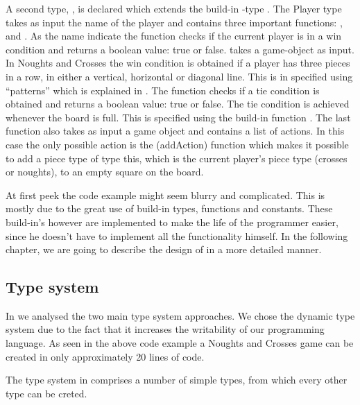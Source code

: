A second type, , is declared which extends the build-in \productname{}-type . The Player type
takes as input the name of the player and contains three important functions: ,  and 
. As the name indicate the  function checks if the current player is in a win condition and returns
a boolean value: true or false.  takes a game-object as input. In Noughts and Crosses the win condition is obtained if a player has three pieces in a row, in either a vertical, horizontal or diagonal line. This is in \productname{} specified using ``patterns'' which is explained in . The  function checks if a tie condition is obtained and returns a boolean value: true or false. The tie condition is achieved whenever the board is full. This is specified using the build-in function . The last function  also takes as input a game object and contains a list of actions. In this case the only possible action is the \function(addAction) function which makes it possible to add a piece type of type this, which is the current player's piece type (crosses or noughts), to an empty square on the board.

At first peek the code example might seem blurry and complicated. This is mostly due to the great use of build-in
types, functions and constants. These build-in's however are implemented to make the life of the programmer easier, since 
he doesn't have to implement all the functionality himself. In the following chapter, we are going to describe the design of \productname{} in a
more detailed manner.  


\subsection*{Type system}

In  we analysed the two main type system approaches. 
We chose the dynamic type system due to the fact that it increases the writability of our programming language. As seen in the
above code example  a Noughts and Crosses game can be created in only approximately 20 lines
of code.

The type system in \productname{} comprises a number of simple types, from which every other type
can be creted.



